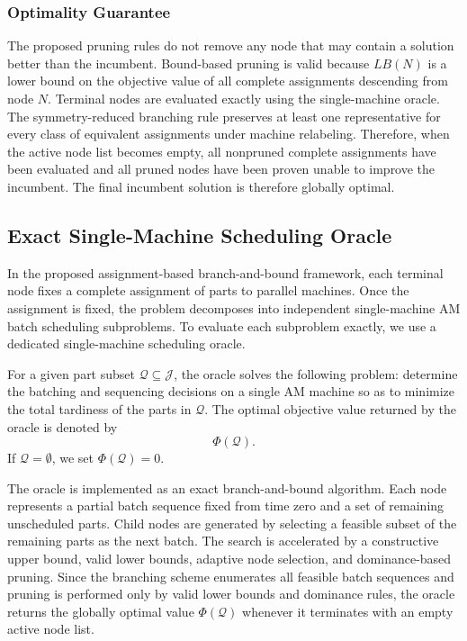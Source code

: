 \documentclass[letterpaper, 10 pt, conference]{ieeeconf}  %
\begin{document}
\subsubsection{Optimality Guarantee}

The proposed pruning rules do not remove any node that may contain a
solution better than the incumbent. Bound-based pruning is valid because
$LB(N)$ is a lower bound on the objective value of all complete assignments
descending from node $N$. Terminal nodes are evaluated exactly using the
single-machine oracle. The symmetry-reduced branching rule preserves at
least one representative for every class of equivalent assignments under
machine relabeling. Therefore, when the active node list becomes empty, all
nonpruned complete assignments have been evaluated and all pruned nodes have
been proven unable to improve the incumbent. The final incumbent solution is
therefore globally optimal.


\subsection{Exact Single-Machine Scheduling Oracle}
\label{subsec:single_machine_oracle}

In the proposed assignment-based branch-and-bound framework, each terminal
node fixes a complete assignment of parts to parallel machines. Once the
assignment is fixed, the problem decomposes into independent single-machine
AM batch scheduling subproblems. To evaluate each subproblem exactly, we use
a dedicated single-machine scheduling oracle.

For a given part subset $\mathcal{Q}\subseteq\mathcal{J}$, the oracle solves
the following problem: determine the batching and sequencing decisions on a
single AM machine so as to minimize the total tardiness of the parts in
$\mathcal{Q}$. The optimal objective value returned by the oracle is denoted
by
\[
\Phi(\mathcal{Q}).
\]
If $\mathcal{Q}=\emptyset$, we set $\Phi(\mathcal{Q})=0$.

The oracle is implemented as an exact branch-and-bound algorithm. Each node
represents a partial batch sequence fixed from time zero and a set of
remaining unscheduled parts. Child nodes are generated by selecting a
feasible subset of the remaining parts as the next batch. The search is
accelerated by a constructive upper bound, valid lower bounds, adaptive node
selection, and dominance-based pruning. Since the branching scheme enumerates
all feasible batch sequences and pruning is performed only by valid lower
bounds and dominance rules, the oracle returns the globally optimal value
$\Phi(\mathcal{Q})$ whenever it terminates with an empty active node list.
\end{document}
